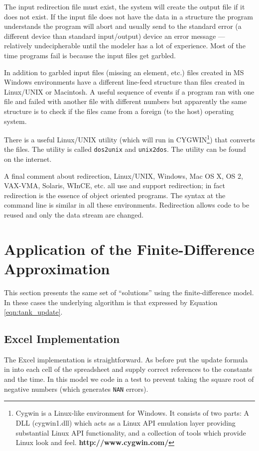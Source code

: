 \documentclass[12pt]{article}
\begin{document}
The input redirection file must exist, the system will create the output file if it does not exist.  If the input file does not have the data in a structure the program understands the program will abort and usually send to the standard error (a different device than standard input/output) device an error message --- relatively undecipherable until the modeler has a lot of experience.  Most of the time programs fail is because the input files get garbled.

In addition to garbled input files (missing an element, etc.) files created in MS Windows environments have a different line-feed structure than files created in Linux/UNIX or Macintosh.  A useful sequence of events if a program ran with one file and failed with another file with different numbers but apparently the same structure is to check if the files came from a foreign (to the host) operating system.

There is a useful Linux/UNIX utility (which will run in CYGWIN\footnote{Cygwin is a Linux-like environment for Windows. It consists of two parts: A DLL (cygwin1.dll) which acts as a Linux API emulation layer providing substantial Linux API functionality, and a collection of tools which provide Linux look and feel. \textbf{http://www.cygwin.com/}}) that converts the files.  The utility is called \texttt{dos2unix} and \texttt{unix2dos}.  The utility can be found on the internet.

A final comment about redirection, Linux/UNIX, Windows, Mac OS X, OS 2, VAX-VMA, Solaris, WInCE, etc. all use and support redirection; in fact redirection is the essence of object oriented programs.  The syntax at the command line is similar in all these environments.  Redirection allows code to be reused and only the data stream are changed.

\section{Application of the Finite-Difference Approximation}
This section presents the same set of ``solutions'' using the finite-difference model.  In these cases the underlying algorithm is that expressed by Equation \ref{eqn:tank_update}.

\subsection{Excel Implementation}
The Excel implementation is straightforward.  As before put the update formula in into each cell of the spreadsheet and supply correct references to the constants and the time.  In this model we code in a test to prevent taking the square root of negative numbers (which generates \texttt{NAN} errors).
\end{document}
